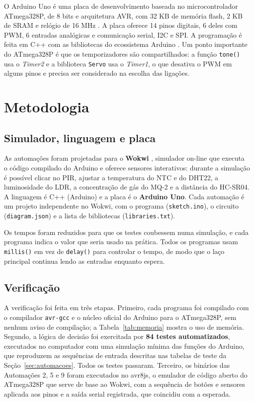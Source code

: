\documentclass[12pt]{article}
\begin{document}
O Arduino Uno é uma placa de desenvolvimento baseada no microcontrolador ATmega328P, de 8 bits e arquitetura AVR, com 32 KB de memória flash, 2 KB de SRAM e relógio de 16 MHz \cite{microchip2018,arduino2024}. A placa oferece 14 pinos digitais, 6 deles com PWM, 6 entradas analógicas e comunicação serial, I2C e SPI. A programação é feita em C++ com as bibliotecas do ecossistema Arduino \cite{mcroberts2018,banzi2014}. Um ponto importante do ATmega328P é que os temporizadores são compartilhados: a função \texttt{tone()} usa o \emph{Timer2} e a biblioteca \texttt{Servo} usa o \emph{Timer1}, o que desativa o PWM em alguns pinos e precisa ser considerado na escolha das ligações.

\section{Metodologia}\label{sec:metodologia}

\subsection{Simulador, linguagem e placa}

As automações foram projetadas para o \textbf{Wokwi} \cite{wokwi2024}, simulador on-line que executa o código compilado do Arduino e oferece sensores interativos: durante a simulação é possível clicar no PIR, ajustar a temperatura do NTC e do DHT22, a luminosidade do LDR, a concentração de gás do MQ-2 e a distância do HC-SR04. A linguagem é C++ (Arduino) e a placa é o \textbf{Arduino Uno}. Cada automação é um projeto independente no Wokwi, com o programa (\texttt{sketch.ino}), o circuito (\texttt{diagram.json}) e a lista de bibliotecas (\texttt{libraries.txt}).

Os tempos foram reduzidos para que os testes coubessem numa simulação, e cada programa indica o valor que seria usado na prática. Todos os programas usam \texttt{millis()} em vez de \texttt{delay()} para controlar o tempo, de modo que o laço principal continua lendo as entradas enquanto espera.

\subsection{Verificação}

A verificação foi feita em três etapas. Primeiro, cada programa foi compilado com o compilador \texttt{avr-gcc} e o núcleo oficial do Arduino para o ATmega328P, sem nenhum aviso de compilação; a Tabela~\ref{tab:memoria} mostra o uso de memória. Segundo, a lógica de decisão foi exercitada por \textbf{84 testes automatizados}, executados no computador com uma simulação mínima das funções do Arduino, que reproduzem as sequências de entrada descritas nas tabelas de teste da Seção~\ref{sec:automacoes}. Todos os testes passaram. Terceiro, os binários das Automações 2, 5 e 9 foram executados no avr8js, o emulador de código aberto do ATmega328P que serve de base ao Wokwi, com a sequência de botões e sensores aplicada aos pinos e a saída serial registrada, que coincidiu com a esperada.
\end{document}
